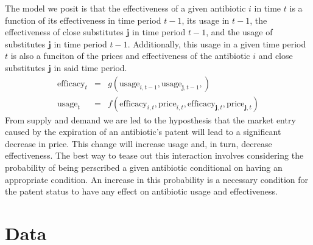 \documentclass[11pt]{SelfArxOneColBMN}
\begin{document}
\noindent
The model we posit is that the effectiveness of a given antibiotic $i$ in time $t$ is a function of its effectiveness in time period $t-1$, its usage in $t-1$, the effectiveness of close substitutes $\bm{j}$ in time period $t-1$, and the usage of substitutes $\bm{j}$ in time period $t -1$. Additionally, this usage in a given time period $t$ is also a funciton of the prices and effectiveness of the antibiotic $i$ and close substitutes $\bm{j}$ in said time period.
\begin{eqnarray}
  \text{efficacy}_t &=& g(\text{usage}_{i,t-1},\text{usage}_{\bm{j},t-1},)\\
  \text{usage}_t &=& f(\text{efficacy}_{i,t},\text{price}_{i,t},\text{efficacy}_{\bm{j},t},\text{price}_{\bm{j},t})
\end{eqnarray}
From supply and demand we are led to the hyposthesis that the market entry caused by the expiration of an antibiotic's patent will lead to a significant decrease in price. This change will increase usage and, in turn, decrease effectiveness. The best way to tease out this interaction involves considering the probability of being perscribed a given antibiotic conditional on having an appropriate condition. An increase in this probability is a necessary condition for the patent status to have any effect on antibiotic usage and effectiveness.




\section{Data}
\label{sec:data}
\end{document}
